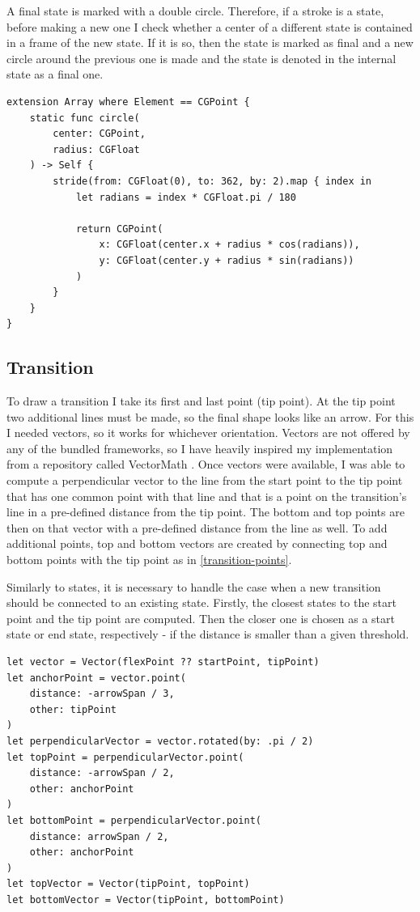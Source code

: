 A final state is marked with a double circle. Therefore, if a stroke is a state, before making a new one I check whether a center of a different state is contained in a frame of the new state. If it is so, then the state is marked as final and a new circle around the previous one is made and the state is denoted in the internal state as a final one.

\begin{lstlisting}[caption=Circle stroke, label=circle-init]
extension Array where Element == CGPoint {
    static func circle(
        center: CGPoint,
        radius: CGFloat
    ) -> Self {
        stride(from: CGFloat(0), to: 362, by: 2).map { index in
            let radians = index * CGFloat.pi / 180
            
            return CGPoint(
                x: CGFloat(center.x + radius * cos(radians)),
                y: CGFloat(center.y + radius * sin(radians))
            )
        }
    }
}
\end{lstlisting}

\subsection{Transition}

To draw a transition I take its first and last point (tip point). At the tip point two additional lines must be made, so the final shape looks like an arrow. For this I needed vectors, so it works for whichever orientation. Vectors are not offered by any of the bundled frameworks, so I have heavily inspired my implementation from a repository called VectorMath \cite{vectormath}. Once vectors were available, I was able to compute a perpendicular vector to the line from the start point to the tip point that has one common point with that line and that is a point on the transition's line in a pre-defined distance from the tip point. The bottom and top points are then on that vector with a pre-defined distance from the line as well. To add additional points, top and bottom vectors are created by connecting top and bottom points with the tip point as in \ref{transition-points}.

Similarly to states, it is necessary to handle the case when a new transition should be connected to an existing state. Firstly, the closest states to the start point and the tip point are computed. Then the closer one is chosen as a start state or end state, respectively - if the distance is smaller than a given threshold.

\begin{lstlisting}[caption={Computation of top and bottom points, vectors}, label=transition-points]
let vector = Vector(flexPoint ?? startPoint, tipPoint)
let anchorPoint = vector.point(
    distance: -arrowSpan / 3, 
    other: tipPoint
)
let perpendicularVector = vector.rotated(by: .pi / 2)
let topPoint = perpendicularVector.point(
    distance: -arrowSpan / 2,
    other: anchorPoint
)
let bottomPoint = perpendicularVector.point(
    distance: arrowSpan / 2,
    other: anchorPoint
)
let topVector = Vector(tipPoint, topPoint)
let bottomVector = Vector(tipPoint, bottomPoint)
\end{lstlisting}

